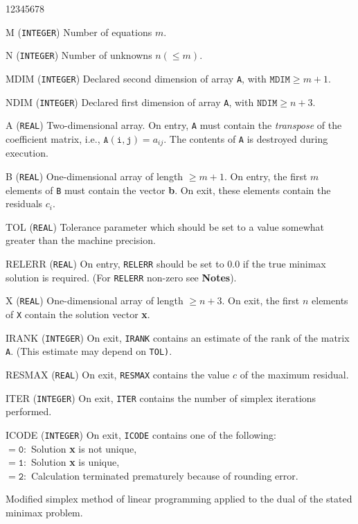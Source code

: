 \begin{DLtt}{12345678}
\item [M]({\tt INTEGER}) Number of equations $m$.
\item [N] ({\tt INTEGER}) Number of unknowns $n (\leq m)$.
\item [MDIM]({\tt INTEGER}) Declared second dimension of array {\tt A},
with $\mathtt{MDIM}\geq m+1$.
\item [NDIM]({\tt INTEGER}) Declared first dimension of array {\tt A},
with $\mathtt{NDIM} \geq n+3$.
\item [A]({\tt REAL}) Two-dimensional array. On entry, {\tt A} must
contain the  {\it transpose} of the coefficient matrix, i.e.,
$\mathtt{A(i,j)}=a_{ij}$. The contents of {\tt A} is destroyed during
execution.
\item [B]({\tt REAL}) One-dimensional array of length $\geq m+1$.
On entry, the first $m$ elements of {\tt B} must contain the vector
{\bf b}. On exit, these elements contain the residuals $c_i$.
\item [TOL]({\tt REAL}) Tolerance parameter which should be set to a
value somewhat greater than the machine precision.
\item [RELERR]({\tt REAL}) On entry, {\tt RELERR} should be set to 0.0
if the true minimax solution is required. (For {\tt RELERR} non-zero
see {\bf Notes}).
\item [X]({\tt REAL}) One-dimensional array of length $\geq n+3$.
On exit, the first $n$ elements of {\tt X} contain the solution vector
{\bf x}.
\item [IRANK]({\tt INTEGER}) On exit, {\tt IRANK} contains an estimate of
the rank of the matrix {\tt A}. (This estimate may depend on {\tt TOL)}.
\item [RESMAX]({\tt REAL}) On exit, {\tt RESMAX} contains the value $c$
of the maximum residual.
\item [ITER]({\tt INTEGER}) On exit, {\tt ITER} contains the number of
simplex iterations performed.
\item [ICODE]({\tt INTEGER}) On exit, {\tt ICODE} contains one of the
following: \\
$\mathtt{= 0:}$ Solution {\bf x} is not unique, \\
$\mathtt{= 1:}$ Solution {\bf x} is unique,\\
$\mathtt{= 2:}$ Calculation terminated prematurely because of rounding
error.
\end{DLtt}
\Method
Modified simplex method of linear programming applied to the dual of
the stated minimax problem.
